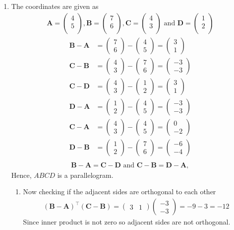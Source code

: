\documentclass[12pt]{article}
\newcommand{\myvec}[1]{\ensuremath{\begin{pmatrix}#1\end{pmatrix}}}
\let\vec\mathbf
\begin{document}
\begin{enumerate}
\item The coordinates are given as
	\begin{align}
	\vec{A} = \myvec{
		4\\
		5\\
		},
	\vec{B} = \myvec{
		7\\
		6\\
		},
	\vec{C} = \myvec{
		4\\
		3\\
		} \text{ and }
	\vec{D} = \myvec{
		1\\
		2\\
		}
	\end{align}
	\begin{align}
		\vec{B} - \vec{A} &= \myvec{7\\6} - \myvec{4\\5} = \myvec{3\\1}\\
		\vec{C} - \vec{B} &= \myvec{4\\3} - \myvec{7\\6} = \myvec{-3\\-3}\\
		\vec{C} - \vec{D} &= \myvec{4\\3} - \myvec{1\\2} = \myvec{3\\1}\\
		\vec{D} - \vec{A} &= \myvec{1\\2} - \myvec{4\\5} = \myvec{-3\\-3}\\
		\vec{C} - \vec{A} &= \myvec{4\\3} - \myvec{4\\5} = \myvec{0\\-2}\\
		\vec{D} - \vec{B} &= \myvec{1\\2} - \myvec{7\\6} = \myvec{-6\\-4}\\
	\end{align}
	\begin{align}
		\vec{B}-\vec{A} = \vec{C}-\vec{D} \text{ and } \vec{C}-\vec{B} = \vec{D}-\vec{A},
	\end{align}
	Hence, $ABCD$ is a parallelogram.
	\begin{enumerate}
		\item Now checking if the adjacent sides are orthogonal to each other
	\begin{align}
		(\vec{B}-\vec{A})^\top (\vec{C}-\vec{B}) = \myvec{3&1} \myvec{-3\\-3} = -9-3 = -12
	\end{align}
	Since inner product is not zero so adjacent sides are not orthogonal.


\end{enumerate}
\end{enumerate}
\end{document}
